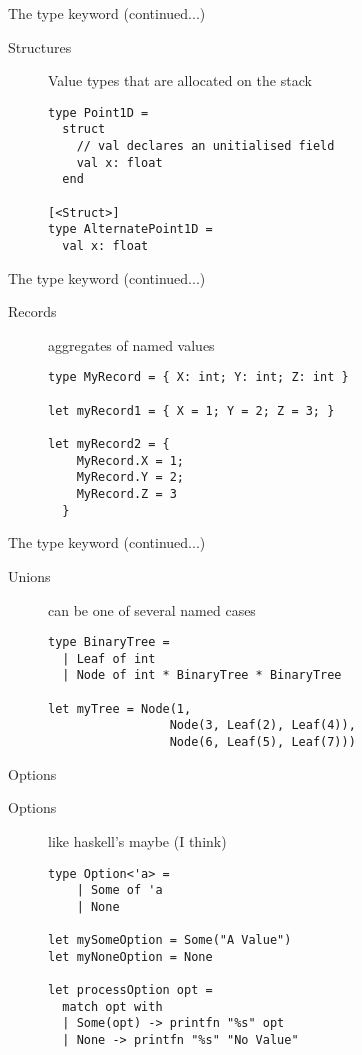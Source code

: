 \documentclass[landscape]{slides}
\begin{document}
\begin{slide}{The type keyword (continued...)}
\begin{description}
\item[Structures] Value types that are allocated on the stack 
\begin{verbatim}
type Point1D =
  struct 
    // val declares an unitialised field 
    val x: float
  end

[<Struct>]
type AlternatePoint1D = 
  val x: float
\end{verbatim}
\end{description}
\end{slide}

\begin{slide}{The type keyword (continued...)}
\begin{description}
\item[Records] aggregates of named values
\begin{verbatim}
type MyRecord = { X: int; Y: int; Z: int }

let myRecord1 = { X = 1; Y = 2; Z = 3; }

let myRecord2 = {
    MyRecord.X = 1; 
    MyRecord.Y = 2; 
    MyRecord.Z = 3 
  }
\end{verbatim}
\end{description}
\end{slide}

\begin{slide}{The type keyword (continued...)}
\begin{description}
\item[Unions] can be one of several named cases 
\begin{verbatim}
type BinaryTree =
  | Leaf of int
  | Node of int * BinaryTree * BinaryTree

let myTree = Node(1, 
                 Node(3, Leaf(2), Leaf(4)), 
                 Node(6, Leaf(5), Leaf(7)))
\end{verbatim}
\end{description}
\end{slide}

\begin{slide}{Options}
\begin{description} 
\item[Options] like haskell's maybe (I think)
\begin{verbatim}
type Option<'a> =
    | Some of 'a
    | None

let mySomeOption = Some("A Value")
let myNoneOption = None

let processOption opt =
  match opt with
  | Some(opt) -> printfn "%s" opt
  | None -> printfn "%s" "No Value"
\end{verbatim}
\end{description}
\end{slide}
\end{document}
